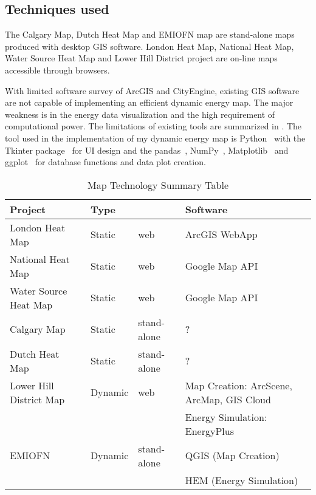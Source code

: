 \subsection{Techniques used}
The Calgary Map, Dutch Heat Map and EMIOFN map are stand-alone maps
produced with desktop GIS software. London Heat Map, National Heat
Map, Water Source Heat Map and Lower Hill District project are on-line
maps accessible through browsers. 

With limited software survey of ArcGIS and CityEngine, existing GIS
software are not capable of implementing an efficient dynamic energy
map. The major weakness is in the energy data visualization and the
high requirement of computational power. The limitations of existing
tools are summarized in . The tool used in the
implementation of my dynamic energy map is Python~\cite{python2015}
with the Tkinter package~\cite{Tkinter2014} for UI design and the
pandas~\cite{pandas2015}, NumPy~\cite{NumPy2015},
Matplotlib~\cite{matplotlib2015} and ggplot~\cite{ggplot2015} for
database functions and data plot creation.

\begin{table}[h!]
\centering
\caption{Map Technology Summary Table}
\label{tab:mapSummary}
\begin{tabular}{p{3cm}|p{3cm}|p{3cm}|p{3cm}}
  \hline
Project                 & Type    &             & Software                                  \\
  \hline
  \hline
London Heat Map         & Static  & web         & ArcGIS WebApp                             \\
  \hline
National Heat Map       & Static  & web         & Google Map API                            \\
  \hline
Water Source Heat Map   & Static  & web         & Google Map API                            \\
  \hline
Calgary Map             & Static  & stand-alone & ?                                         \\
  \hline
Dutch Heat Map          & Static  & stand-alone & ?                                         \\
  \hline
  \hline
Lower Hill District Map & Dynamic & web         & Map Creation: ArcScene, ArcMap, GIS Cloud \\
                        &         &             & Energy Simulation: EnergyPlus             \\
  \hline
EMIOFN                  & Dynamic & stand-alone & QGIS (Map Creation)                       \\
                        &         &             & HEM (Energy Simulation)                  \\
  \hline
\end{tabular}
\end{table}

